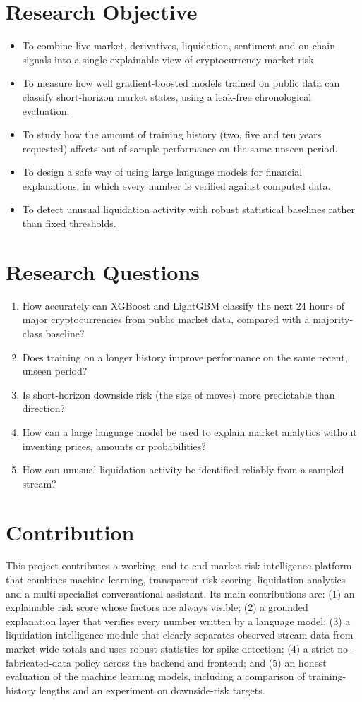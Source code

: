 \section{Research Objective}
\begin{itemize}
\item To combine live market, derivatives, liquidation, sentiment and on-chain signals into a single explainable view of cryptocurrency market risk.
\item To measure how well gradient-boosted models trained on public data can classify short-horizon market states, using a leak-free chronological evaluation.
\item To study how the amount of training history (two, five and ten years requested) affects out-of-sample performance on the same unseen period.
\item To design a safe way of using large language models for financial explanations, in which every number is verified against computed data.
\item To detect unusual liquidation activity with robust statistical baselines rather than fixed thresholds.
\end{itemize}

\section{Research Questions}
\begin{enumerate}[label=RQ\arabic*.]
\item How accurately can XGBoost and LightGBM classify the next 24 hours of major cryptocurrencies from public market data, compared with a majority-class baseline?
\item Does training on a longer history improve performance on the same recent, unseen period?
\item Is short-horizon downside risk (the size of moves) more predictable than direction?
\item How can a large language model be used to explain market analytics without inventing prices, amounts or probabilities?
\item How can unusual liquidation activity be identified reliably from a sampled stream?
\end{enumerate}

\section{Contribution}
This project contributes a working, end-to-end market risk intelligence platform that combines machine learning, transparent risk scoring, liquidation analytics and a multi-specialist conversational assistant. Its main contributions are: (1) an explainable risk score whose factors are always visible; (2) a grounded explanation layer that verifies every number written by a language model; (3) a liquidation intelligence module that clearly separates observed stream data from market-wide totals and uses robust statistics for spike detection; (4) a strict no-fabricated-data policy across the backend and frontend; and (5) an honest evaluation of the machine learning models, including a comparison of training-history lengths and an experiment on downside-risk targets.

